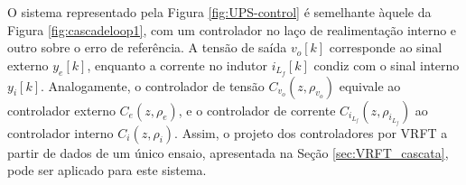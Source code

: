 \documentclass[repeatfields,oneside,overleaf]{tcc}
\newcommand{\myvo}{ {v_o} }
\newcommand{\myilf}{ {i{_{L_f}}} }
\newcommand{\myC}[2][]{ C_{#1} \left( #2 \right) }
\newcommand{\myCzrho}[1]{ \myC[#1]{z, \rho_{#1}} }
\begin{document}
O sistema representado pela Figura \ref{fig:UPS-control} é semelhante àquele da Figura \ref{fig:cascadeloop1}, com um controlador no laço de realimentação interno e outro sobre o erro de referência.
A tensão de saída $\myvo[k]$ corresponde ao sinal externo $y_e[k]$, enquanto a corrente no indutor $\myilf[k]$ condiz com o sinal interno $y_i[k]$.
Analogamente, o controlador de tensão $\myCzrho{\myvo}$ equivale ao controlador externo $\myCzrho{e}$, e o controlador de corrente $\myCzrho{\myilf}$ ao controlador interno $\myCzrho{i}$.
Assim, o projeto dos controladores por VRFT a partir de dados de um único ensaio, apresentada na Seção \ref{sec:VRFT_cascata}, pode ser aplicado para este sistema.
\end{document}
